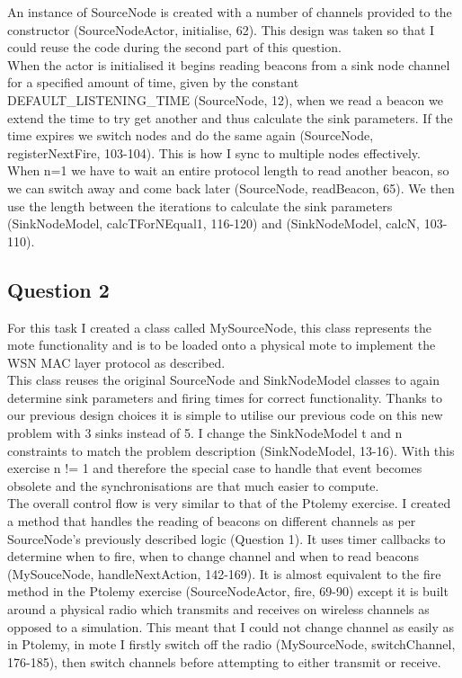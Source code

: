 \documentclass[12pt]{article} %
\begin{document}
An instance of SourceNode is created with a number of channels provided to the constructor (SourceNodeActor, initialise, 62). This design was taken so that I could reuse the code during the second part of this question.
\\

When the actor is initialised it begins reading beacons from a sink node channel for a specified amount of time, given by the constant DEFAULT\_LISTENING\_TIME (SourceNode, 12), when we read a beacon we extend the time to try get another and thus calculate the sink parameters. If the time expires we switch nodes and do the same again (SourceNode, registerNextFire, 103-104). This is how I sync to multiple nodes effectively.
\\

When n=1 we have to wait an entire protocol length to read another beacon, so we can switch away and come back later (SourceNode, readBeacon, 65). We then use the length between the iterations to calculate the sink parameters (SinkNodeModel, calcTForNEqual1, 116-120) and (SinkNodeModel, calcN, 103-110).


\subsection{Question 2} %
For this task I created a class called MySourceNode, this class represents the mote functionality and is to be loaded onto a physical mote to implement the WSN MAC layer protocol as described.
\\

This class reuses the original SourceNode and SinkNodeModel classes to again determine sink parameters and firing times for correct functionality. Thanks to our previous design choices it is simple to utilise our previous code on this new problem with 3 sinks instead of 5. I change the SinkNodeModel t and n constraints to match the problem description (SinkNodeModel, 13-16). With this exercise n != 1 and therefore the special case to handle that event becomes obsolete and the synchronisations are that much easier to compute.
\\

The overall control flow is very similar to that of the Ptolemy exercise. I created a method that handles the reading of beacons on different channels as per SourceNode's previously described logic (Question 1). It uses timer callbacks to determine when to fire, when to change channel and when to read beacons (MySouceNode, handleNextAction, 142-169). It is almost equivalent to the fire method in the Ptolemy exercise (SourceNodeActor, fire, 69-90) except it is built around a physical radio which transmits and receives on wireless channels as opposed to a simulation. This meant that I could not change channel as easily as in Ptolemy, in mote I firstly switch off the radio (MySourceNode, switchChannel, 176-185), then switch channels before attempting to either transmit or receive.
\\
\end{document}
